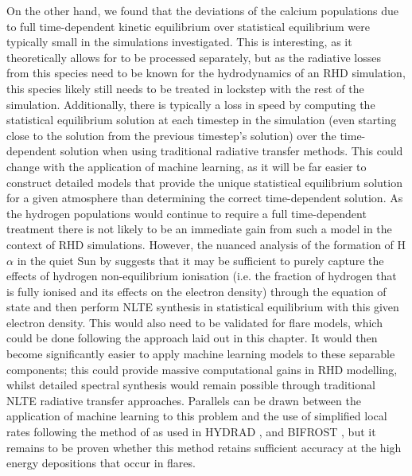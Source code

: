 On the other hand, we found that the deviations of the calcium populations due to full time-dependent kinetic equilibrium over statistical equilibrium were typically small in the simulations investigated.
This is interesting, as it theoretically allows for \Caii{} to be processed separately, but as the radiative losses from this species need to be known for the hydrodynamics of an RHD simulation, this species likely still needs to be treated in lockstep with the rest of the simulation.
Additionally, there is typically a loss in speed by computing the statistical equilibrium solution at each timestep in the simulation (even starting close to the solution from the previous timestep's solution) over the time-dependent solution when using traditional radiative transfer methods.
This could change with the application of machine learning, as it will be far easier to construct detailed models that provide the unique statistical equilibrium solution for a given atmosphere than determining the correct time-dependent solution.
As the hydrogen populations would continue to require a full time-dependent treatment there is not likely to be an immediate gain from such a model in the context of RHD simulations.
However, the nuanced analysis of the formation of H$\alpha$ in the quiet Sun by \citet{Leenaarts2012a} suggests that it may be sufficient to purely capture the effects of hydrogen non-equilibrium ionisation (i.e. the fraction of hydrogen that is fully ionised and its effects on the electron density) through the equation of state and then perform NLTE synthesis in statistical equilibrium with this given electron density.
This would also need to be validated for flare models, which could be done following the approach laid out in this chapter.
It would then become significantly easier to apply machine learning models to these separable components; this could provide massive computational gains in RHD modelling, whilst detailed spectral synthesis would remain possible through traditional NLTE radiative transfer approaches.
Parallels can be drawn between the application of machine learning to this problem and the use of simplified local rates following the method of \citet{Sollum1999} as used in HYDRAD \citep{Reep2019}, and BIFROST \citep{Gudiksen2011, Leenaarts2007}, but it remains to be proven whether this method retains sufficient accuracy at the high energy depositions that occur in flares.

